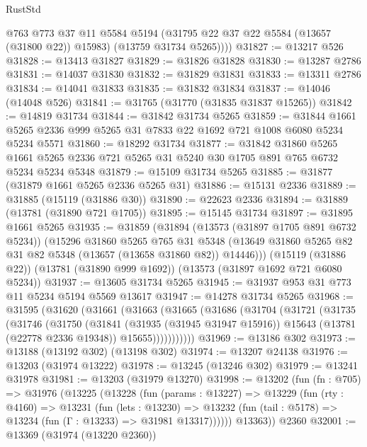 \begin{lexlean}{RustStd}
\begin{coremodule}
          @763
          @773
          @37
          @11
          @5584
          @5194
          (@31795 @22 @37 @22 @5584 (@13657 (@31800 @22)) @15983)
          (@13759 @31734 @5265))))
@31827 := @13217 @526
@31828 := @13413 @31827
@31829 := @31826 @31828
@31830 := @13287 @2786
@31831 := @14037 @31830
@31832 := @31829 @31831
@31833 := @13311 @2786
@31834 := @14041 @31833
@31835 := @31832 @31834
@31837 := @14046 (@14048 @526)
@31841 := @31765 (@31770 (@31835 @31837 @15265))
@31842 := @14819 @31734
@31844 := @31842 @31734 @5265
@31859 := @31844 @1661 @5265 @2336 @999 @5265 @31 @7833 @22 @1692 @721 @1008 @6080 @5234 @5234 @5571
@31860 := @18292 @31734
@31877 := @31842
    @31860
    @5265
    @1661
    @5265
    @2336
    @721
    @5265
    @31
    @5240
    @30
    @1705
    @891
    @765
    @6732
    @5234
    @5234
    @5348
@31879 := @15109 @31734 @5265
@31885 := @31877 (@31879 @1661 @5265 @2336 @5265 @31)
@31886 := @15131 @2336
@31889 := @31885 (@15119 (@31886 @30))
@31890 := @22623 @2336
@31894 := @31889 (@13781 (@31890 @721 @1705))
@31895 := @15145 @31734
@31897 := @31895 @1661 @5265
@31935 := @31859
    (@31894
      (@13573 (@31897 @1705 @891 @6732 @5234))
      (@15296
        @31860
        @5265
        @765
        @31
        @5348
        (@13649 @31860 @5265 @82 @31 @82 @5348 (@13657 (@13658 @31860 @82)) @14446)))
    (@15119 (@31886 @22))
    (@13781 (@31890 @999 @1692))
    (@13573 (@31897 @1692 @721 @6080 @5234))
@31937 := @13605 @31734 @5265
@31945 := @31937 @953 @31 @773 @11 @5234 @5194 @5569 @13617
@31947 := @14278 @31734 @5265
@31968 := @31595
    (@31620
      (@31661
        (@31663
          (@31665
            (@31686
              (@31704
                (@31721
                  (@31735
                    (@31746
                      (@31750
                        (@31841
                          (@31935 (@31945 @31947 @15916))
                          @15643
                          (@13781 (@22778 @2336 @19348))
                          @15655)))))))))))
@31969 := @13186 @302
@31973 := @13188 (@13192 @302) (@13198 @302)
@31974 := @13207 @24138
@31976 := @13203 (@31974 @13222)
@31978 := @13245 (@13246 @302)
@31979 := @13241 @31978
@31981 := @13203 (@31979 @13270)
@31998 := @13202
    (fun (fn : @705) =>
    @31976
      (@13225
        (@13228
          (fun (params : @13227) =>
          @13229
            (fun (rty : @4160) =>
            @13231
              (fun (lets : @13230) =>
              @13232 (fun (tail : @5178) => @13234 (fun (Γ : @13233) => @31981 @13317))))))
        @13363))
    @2360
@32001 := @13369 (@31974 (@13220 @2360))

\end{coremodule}
\end{lexlean}
